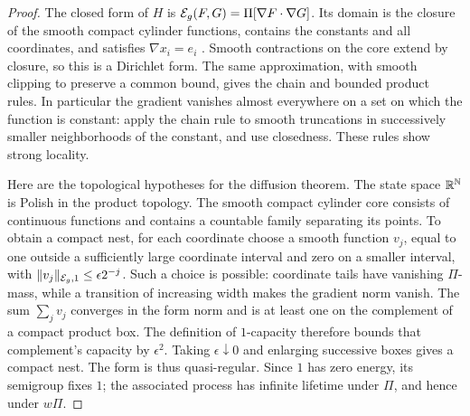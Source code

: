 \begin{proof}
The closed form of \(H\) is
\(\mathcal E_g(F,G)=\Pi[\nabla F\cdot\nabla G]\).  Its domain is the closure
of the smooth compact cylinder functions, contains the constants and all
coordinates, and satisfies \(\nabla x_i=e_i\)
\cite[Proposition~5.1]{FUA}.
Smooth contractions on the core extend by closure, so this is a
Dirichlet form.  The same approximation, with smooth clipping to preserve
a common bound, gives the chain and bounded product rules.  In particular
the gradient vanishes almost everywhere on a set on which the function is
constant: apply the chain rule to smooth truncations in successively
smaller neighborhoods of the constant, and use closedness.  These rules
show strong locality.

Here are the topological hypotheses for the diffusion theorem.  The
state space \(\mathbb R^\mathbb N\) is Polish in the product topology.  The smooth
compact cylinder core consists of continuous functions and contains
a countable family separating its points.  To obtain a compact nest,
for each coordinate choose a smooth
function \(v_j\), equal to one outside a sufficiently large coordinate
interval and zero on a smaller interval, with
\(\|v_j\|_{\mathcal E_g,1}\le\epsilon2^{-j}\).  Such a choice is possible:
coordinate tails have vanishing \(\Pi\)-mass, while a transition of
increasing width makes the gradient norm vanish.  The sum
\(\sum_jv_j\) converges in the form norm and is at least one on the
complement of a compact product box.  The definition of \(1\)-capacity
therefore bounds that complement's capacity by \(\epsilon^2\).
Taking \(\epsilon\downarrow0\) and enlarging successive boxes gives a
compact nest.  The form is thus quasi-regular.  Since \(1\) has zero
energy, its semigroup fixes \(1\); the associated process has infinite
lifetime under \(\Pi\), and hence under \(w\Pi\).


\end{proof}
